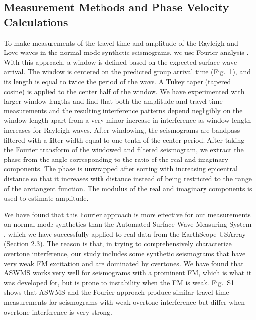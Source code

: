 \documentclass[extra,mreferee]{gji}
\begin{document}
\subsection{Measurement Methods and Phase Velocity Calculations}

To make measurements of the travel time and amplitude of the Rayleigh and Love waves in the normal-mode synthetic seismograms, we use Fourier analysis \citep{forsyth2005array}. With this approach, a window is defined based on the expected surface-wave arrival. The window is centered on the predicted group arrival time (Fig.\ 1), and its length is equal to twice the period of the wave. A Tukey taper (tapered cosine) is applied to the center half of the window. We have experimented with larger window lengths and find that both the amplitude and travel-time measurements and the resulting interference patterns depend negligibly on the window length apart from a very minor increase in interference as window length increases for Rayleigh waves. After windowing, the seismograms are bandpass filtered with a filter width equal to one-tenth of the center period. After taking the Fourier transform of the windowed and filtered seismogram, we extract the phase from the angle corresponding to the ratio of the real and imaginary components. The phase is unwrapped after sorting with increasing epicentral distance so that it increases with distance instead of being restricted to the range of the arctangent function. The modulus of the real and imaginary components is used to estimate amplitude. 

We have found that this Fourier approach is more effective for our measurements on normal-mode synthetics than the Automated Surface Wave Measuring System \citep{jingmcc}, which we have successfully applied to real data from the EarthScope USArray (Section 2.3). The reason is that, in trying to comprehensively characterize overtone interference, our study includes some synthetic seismograms that have very weak FM excitation and are dominated by overtones. We have found that ASWMS works very well for seismograms with a prominent FM, which is what it was developed for, but is prone to instability when the FM is weak. Fig.\ S1 shows that ASWMS and the Fourier approach produce similar travel-time measurements for seismograms with weak overtone interference but differ when overtone interference is very strong.  
\end{document}
